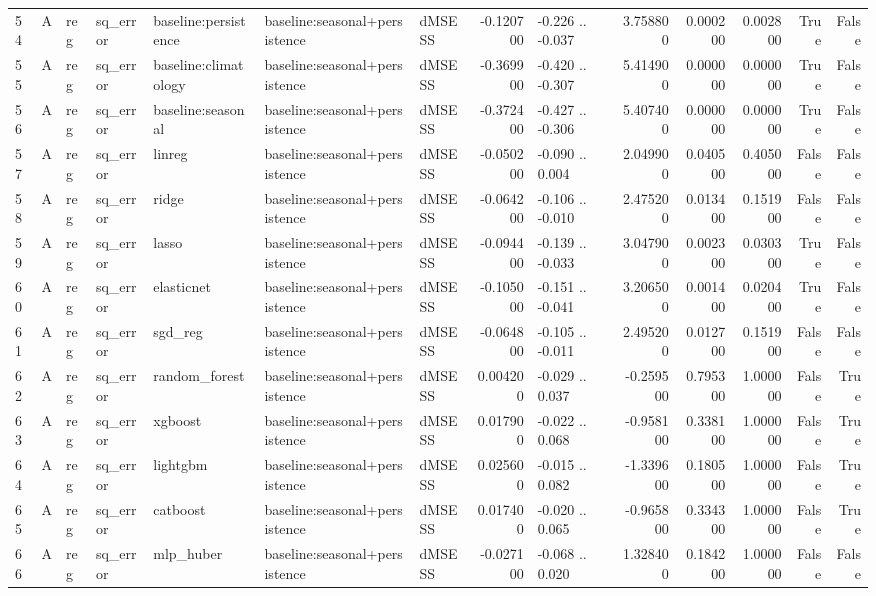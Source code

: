 \begin{table}
\begin{tabular}{lllllllrlrrrrr}
54 & A & reg & sq\_error & baseline:persistence & baseline:seasonal+persistence & dMSESS & -0.120700 & -0.226 .. -0.037 & 3.758800 & 0.000200 & 0.002800 & True & False \\
55 & A & reg & sq\_error & baseline:climatology & baseline:seasonal+persistence & dMSESS & -0.369900 & -0.420 .. -0.307 & 5.414900 & 0.000000 & 0.000000 & True & False \\
56 & A & reg & sq\_error & baseline:seasonal & baseline:seasonal+persistence & dMSESS & -0.372400 & -0.427 .. -0.306 & 5.407400 & 0.000000 & 0.000000 & True & False \\
57 & A & reg & sq\_error & linreg & baseline:seasonal+persistence & dMSESS & -0.050200 & -0.090 .. 0.004 & 2.049900 & 0.040500 & 0.405000 & False & False \\
58 & A & reg & sq\_error & ridge & baseline:seasonal+persistence & dMSESS & -0.064200 & -0.106 .. -0.010 & 2.475200 & 0.013400 & 0.151900 & False & False \\
59 & A & reg & sq\_error & lasso & baseline:seasonal+persistence & dMSESS & -0.094400 & -0.139 .. -0.033 & 3.047900 & 0.002300 & 0.030300 & True & False \\
60 & A & reg & sq\_error & elasticnet & baseline:seasonal+persistence & dMSESS & -0.105000 & -0.151 .. -0.041 & 3.206500 & 0.001400 & 0.020400 & True & False \\
61 & A & reg & sq\_error & sgd\_reg & baseline:seasonal+persistence & dMSESS & -0.064800 & -0.105 .. -0.011 & 2.495200 & 0.012700 & 0.151900 & False & False \\
62 & A & reg & sq\_error & random\_forest & baseline:seasonal+persistence & dMSESS & 0.004200 & -0.029 .. 0.037 & -0.259500 & 0.795300 & 1.000000 & False & True \\
63 & A & reg & sq\_error & xgboost & baseline:seasonal+persistence & dMSESS & 0.017900 & -0.022 .. 0.068 & -0.958100 & 0.338100 & 1.000000 & False & True \\
64 & A & reg & sq\_error & lightgbm & baseline:seasonal+persistence & dMSESS & 0.025600 & -0.015 .. 0.082 & -1.339600 & 0.180500 & 1.000000 & False & True \\
65 & A & reg & sq\_error & catboost & baseline:seasonal+persistence & dMSESS & 0.017400 & -0.020 .. 0.065 & -0.965800 & 0.334300 & 1.000000 & False & True \\
66 & A & reg & sq\_error & mlp\_huber & baseline:seasonal+persistence & dMSESS & -0.027100 & -0.068 .. 0.020 & 1.328400 & 0.184200 & 1.000000 & False & False \\

\end{tabular}
\end{table}
